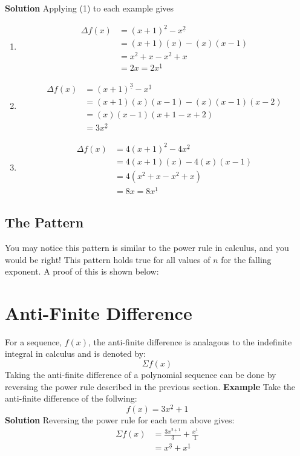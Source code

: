 \documentclass{article}
\begin{document}
\textbf{Solution}
Applying (1) to each example gives
\begin{enumerate}
    \item \begin{align*}
        \Delta f(x) & = (x+1)^{\underline{2}} - x^{\underline{2}} \\
        & = (x+1)(x) - (x)(x-1) \\
        & = x^2 + x - x^2 + x \\
        & = 2x = 2x^{\underline{1}}
    \end{align*}

    \item \begin{align*}
        \Delta f(x) & = (x+1)^{\underline{3}} - x^{\underline{3}} \\
        & = (x+1)(x)(x-1) - (x)(x-1)(x-2) \\
        & = (x)(x-1)(x+1-x+2) \\
        & = 3x^{\underline{2}} 
    \end{align*}

    \item \begin{align*}
        \Delta f(x) & = 4(x+1)^{\underline{2}} - 4x^{\underline{2}} \\
        & = 4(x+1)(x) - 4(x)(x-1) \\
        & = 4(x^2 + x - x^2 + x) \\
        & = 8x = 8x^{\underline{1}}
    \end{align*}
\end{enumerate}

\subsection{The Pattern}
You may notice this pattern is similar to the power rule in calculus, and you would be right! This pattern holds true for all values of \(n\) for the falling exponent. 
A proof of this is shown below:

\section{Anti-Finite Difference}
For a sequence, \(f(x)\), the anti-finite difference is analagous to the indefinite integral in calculus and is denoted by: 
\[\Sigma f(x)\]
Taking the anti-finite difference of a polynomial sequence can be done by reversing the power rule described in the previous section. 
\textbf{Example} 
Take the anti-finite difference of the follwing: \[f(x) = 3x^{\underline{2}} + 1\]
\textbf{Solution}
Reversing the power rule for each term above gives: 
\begin{align*}
    \Sigma f(x) & = \frac{3x^{\underline{2+1}}}{3} + \frac{x^{\underline{1}}}{1} \\
    & = x^{\underline{3}} + x^{\underline{1}}
\end{align*}
\end{document}
